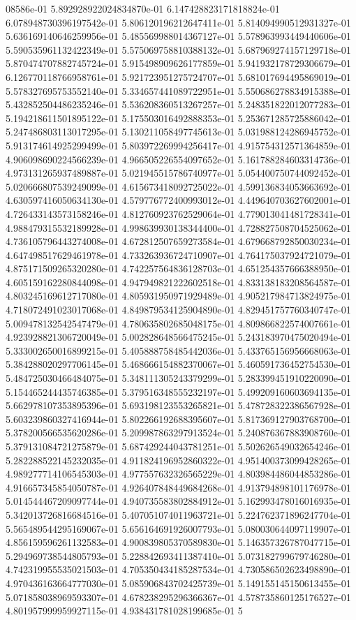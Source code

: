 08586e-01	5.892928922024834870e-01	6.147428823171818824e-01	6.078948730396197542e-01	5.806120196212647411e-01	5.814094990512931327e-01	5.636169140646259956e-01	5.485569988014367127e-01	5.578963993449440606e-01	5.590535961132422349e-01	5.575069758810388132e-01	5.687969274157129718e-01	5.870474707882745724e-01	5.915498909626177859e-01	5.941932178729306679e-01	6.126770118766958761e-01	5.921723951275724707e-01	5.681017694495869019e-01	5.578327695753552140e-01	5.334657441089722951e-01	5.550686278834915388e-01	5.432852504486235246e-01	5.536208360513267257e-01	5.248351822012077283e-01	5.194218611501895122e-01	5.175503016492888353e-01	5.253671285725886042e-01	5.247486803113017295e-01	5.130211058497745613e-01	5.031988124286945752e-01	5.913174614925299499e-01	5.803972269994256417e-01	4.915754312571364859e-01	4.906098690224566239e-01	4.966505226554097652e-01	5.161788284603314736e-01	4.973131265937489887e-01	5.021945515786740977e-01	5.054400750744092452e-01	5.020666807539249099e-01	4.615673418092725022e-01	4.599136834053663692e-01	4.630597416050634130e-01	4.579776772400993012e-01	4.449640703627602001e-01	4.726433143573158246e-01	4.812760923762529064e-01	4.779013041481728341e-01	4.988479315532189928e-01	4.998639930138344400e-01	4.728827508704525062e-01	4.736105796443274008e-01	4.672812507659273584e-01	4.679668792850030234e-01	4.647498517629461978e-01	4.733263936724710907e-01	4.764175037924721079e-01	4.875171509265320280e-01	4.742257564836128703e-01	4.651254357666388950e-01	4.605159162280844098e-01	4.947949821222602518e-01	4.833138183208564587e-01	4.803245169612717080e-01	4.805931950971929489e-01	4.905217984713824975e-01	4.718072491023017068e-01	4.849879534125904890e-01	4.829451757760340747e-01	5.009478132542547479e-01	4.780635802685048175e-01	4.809866822574007661e-01	4.923928821306720049e-01	5.002828648566475245e-01	5.243183970475020494e-01	5.333002650016899215e-01	5.405888758485442036e-01	5.433765156956668063e-01	5.384288020297706145e-01	5.468666154882370067e-01	5.460591736452754530e-01	5.484725030466484075e-01	5.348111305243379299e-01	5.283399451910220090e-01	5.154465244435746385e-01	5.379516348555232197e-01	5.499209160603694135e-01	5.662978107353895396e-01	5.693198123553265821e-01	5.478728322386567928e-01	5.603239860327416944e-01	5.802266192688395607e-01	5.817369127903768700e-01	5.378200566535620286e-01	5.209987863297913524e-01	5.240876367883908760e-01	5.379131084721275879e-01	5.687429244043781251e-01	5.502626549032654246e-01	5.282288522145232035e-01	4.911824196952860322e-01	4.951400373099428265e-01	4.989277714106545303e-01	4.977557632326565229e-01	4.803984486044853286e-01	4.916657345854050787e-01	4.926407848449684268e-01	4.913794898101176978e-01	5.014544467209097744e-01	4.940735583802884912e-01	5.162993478016016935e-01	5.342013726816684516e-01	5.407051074011963721e-01	5.224762371896247704e-01	5.565489544295169067e-01	5.656164691926007793e-01	5.080030644097119907e-01	4.856159596261132583e-01	4.900839805370589830e-01	5.146357326787047715e-01	5.294969738544805793e-01	5.228842693411387410e-01	5.073182799679746280e-01	4.742319955535021503e-01	4.705350434185287534e-01	4.730586502623498890e-01	4.970436163664777030e-01	5.085906843702425739e-01	5.149155145150613455e-01	5.071858038969593307e-01	4.678238295296366367e-01	4.578735860125176527e-01	4.801957999959927115e-01	4.938431781028199685e-01	5